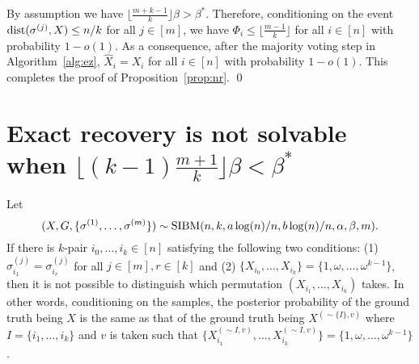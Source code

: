 \documentclass{article}
\begin{document}
By assumption we have $\lfloor \frac{m+k-1}{k} \rfloor \beta>\beta^\ast$. Therefore, conditioning on the event $\operatorname{dist}(\sigma^{(j)}, X) \le n/k$ for all $j\in[m]$, we have $\Phi_i\le \lfloor \frac{m-1}{k} \rfloor$ for all $i\in[n]$ with probability $1-o(1)$. As a consequence, after the majority voting step in Algorithm~\ref{alg:ez}, $\hat{X}_i=X_i$ for all $i\in[n]$ with probability $1-o(1)$. This completes the proof of Proposition~\ref{prop:nr}.
\hfill\qed
\section{Exact recovery is not solvable when $\lfloor (k-1)\frac{m+1}{k} \rfloor \beta < \beta^\ast$}\label{sect:converse}

\begin{lemma} \label{lm:qq}
	Let 
	$$
	(X,G,\{\sigma^{(1)},\dots,\sigma^{(m)}\})\sim \operatorname{SIBM}(n,k,a\log(n)/n, b\log(n)/n,\alpha,\beta, m) .
	$$
	If there is $k$-pair $i_0,\dots, i_{k}\in[n]$ satisfying the following two conditions: (1) $\sigma_{i_1}^{(j)}=\sigma_{i_r}^{(j)}$ for all $j\in[m], r \in [k] $ and (2) $\{X_{i_0}, \dots, X_{i_{k}}\} = \{1,\omega, \dots, \omega^{k-1} \}$, then it is not possible to distinguish which permutation $(X_{i_1}, \dots, X_{i_k})$ takes. In other words, conditioning on the samples, the posterior probability of the ground truth being $X$ is the same as that of the ground truth being $X^{(\sim\{I\},v)}$ where $I=\{i_1, \dots, i_k\}$ and $v$ is taken such that $\{X^{(\sim I, v)}_{i_1}, \dots, X^{(\sim I,v)}_{i_k}\} = \{1,\omega, \dots, \omega^{k-1} \}$.
\end{lemma}
\end{document}
